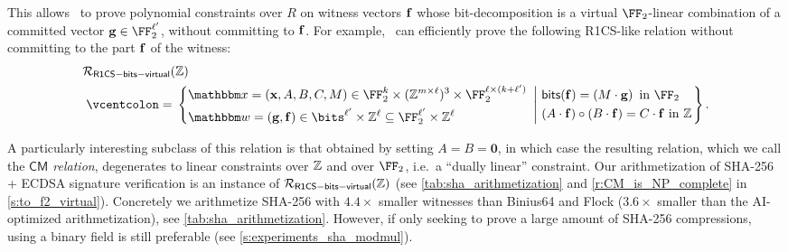  This allows \ftwoz\  to prove polynomial constraints over $R$ on witness vectors $\mathbf{f}$ whose bit-decomposition is a virtual $\FF_2$-linear combination of a committed vector $\bfg\in \FF_2^{\codedim'}$, without committing to $\mathbf{f}$. For example, \ftwoz \ can efficiently prove the following R1CS-like relation without committing to the part $\mathbf{f}$ of the witness:
%
\iflncs\begingroup\small\fi
\begin{align*}
&\Relation_{\mathsf{R1CS-bits-virtual}}(\ZZ)\\ & \defeq \left\{ \begin{aligned}
    &\inp= (\xx, A,B,C, M)\in \FF_2^{\inplen} \times (\ZZ^{m\times \codedim})^3 \times \FF_2^{\codedim \times (\inplen+\codedim')}\\
    & \wit = (\bfg,\bff) \in \bits^{\codedim'}\times\ZZ^{\codedim} \subseteq \FF_2^{\codedim'}\times  \ZZ^{\codedim}
\end{aligned}\  \left| \  \begin{aligned} %
&\bitstext(\bff)= \left(  M\cdot \bfg\right)    \text{ in } \FF_2\\
&(A\cdot \bff) \circ (B\cdot \bff) = C \cdot \bff\ \text{in } \ZZ 
\end{aligned} \right.\right\}.
\end{align*}
\iflncs\endgroup\fi
%

A particularly interesting subclass of this relation is that obtained by setting $A=B=\mathbf{0}$, in which case the resulting relation, which we call the \emph{$\mathsf{CM}$ relation}, degenerates to linear constraints over $\mathbb{Z}$ and over $\FF_2$, i.e.\ a ``dually linear'' constraint. 
\iflncs
 Our arithmetization of SHA-256 + ECDSA signature verification is an instance of $\mathcal{R}_{\mathsf{R1CS-bits-virtual}}(\mathbb{Z})$ (see \cref{tab:sha_arithmetization} and \cref{r:CM_is_NP_complete} in \cref{s:to_f2_virtual}). Concretely  we arithmetize SHA-256 with $4.4\times$ smaller witnesses than Binius64 \cite{binius64} and Flock \cite{flock} ($3.6\times$ smaller than the AI-optimized arithmetization), see \cref{tab:sha_arithmetization}. However, if only seeking to prove a large amount of SHA-256 compressions, using a binary field is still preferable (see \cref{s:experiments_sha_modmul}).
\else

